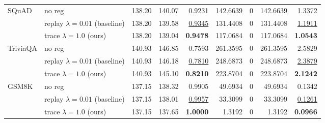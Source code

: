 \begin{table}[t]
{\begin{tabular}{l l rrrrrrr}
\midrule
SQuAD & no reg & 138.20 & 140.07 & \cellcolor{red!18} 0.9231 & \cellcolor{red!18} 142.6639 & \cellcolor{cyan!12} $0$ & \cellcolor{red!18} 142.6639 & \cellcolor{red!18} 1.3372 \\
 & replay $\lambda{=}0.01$ (baseline) & 138.20 & 139.58 & \cellcolor{red!18} \underline{0.9345} & \cellcolor{red!18} 131.4408 & \cellcolor{cyan!12} $0$ & \cellcolor{red!18} 131.4408 & \cellcolor{red!18} \underline{1.1911} \\
 & trace $\lambda{=}1.0$ (ours) & 138.20 & 139.04 & \cellcolor{red!18} \textbf{0.9478} & \cellcolor{red!18} 117.0684 & \cellcolor{cyan!12} $0$ & \cellcolor{red!18} 117.0684 & \cellcolor{red!18} \textbf{1.0543} \\
\midrule
TriviaQA & no reg & 140.93 & 146.85 & \cellcolor{red!35} 0.7593 & \cellcolor{red!35} 261.3595 & \cellcolor{cyan!12} $0$ & \cellcolor{red!35} 261.3595 & \cellcolor{red!35} 2.5829 \\
 & replay $\lambda{=}0.01$ (baseline) & 140.93 & 146.18 & \cellcolor{red!35} \underline{0.7810} & \cellcolor{red!35} 248.6873 & \cellcolor{cyan!12} $0$ & \cellcolor{red!35} 248.6873 & \cellcolor{red!35} \underline{2.3879} \\
 & trace $\lambda{=}1.0$ (ours) & 140.93 & 145.10 & \cellcolor{red!18} \textbf{0.8210} & \cellcolor{red!18} 223.8704 & \cellcolor{cyan!12} $0$ & \cellcolor{red!18} 223.8704 & \cellcolor{red!18} \textbf{2.1242} \\
\midrule
GSM8K & no reg & 137.15 & 138.32 & 0.9905 & 49.6934 & \cellcolor{cyan!12} $0$ & 49.6934 & 0.1342 \\
 & replay $\lambda{=}0.01$ (baseline) & 137.15 & 138.01 & \underline{0.9957} & 33.3099 & \cellcolor{cyan!12} $0$ & 33.3099 & \underline{0.1261} \\
 & trace $\lambda{=}1.0$ (ours) & 137.15 & 137.65 & \textbf{1.0000} & 1.3192 & \cellcolor{cyan!12} $0$ & 1.3192 & \textbf{0.0966} \\
\bottomrule
\end{tabular}}
\end{table}